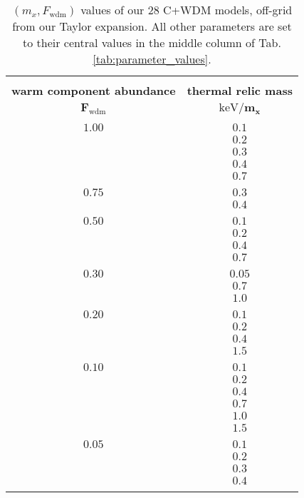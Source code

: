 \begin{table}
\begin{center}
\begin{tabular}{cc}
\hline \\[-10pt]
\textbf{warm component abundance} & \textbf{thermal relic mass} \\[2pt]
$\pmb{F_{\mathrm{wdm}}}$ & $\pmb{\mathrm{keV}/m_x}$ \\[2pt]
\hline \\[-10pt]
$1.00$ & $0.1$ \\[2pt]
 & $0.2$ \\[2pt]
 & $0.3$ \\[2pt]
 & $0.4$ \\[2pt]
 & $0.7$ \\[2pt]
\hline \\[-10pt]
$0.75$ & $0.3$ \\[2pt]
 & $0.4$ \\[2pt]
\hline \\[-10pt]
$0.50$ & $0.1$ \\[2pt]
 & $0.2$ \\[2pt]
 & $0.4$ \\[2pt]
 & $0.7$ \\[2pt]
\hline \\[-10pt]
$0.30$ & $0.05$ \\[2pt]
 & $0.7$ \\[2pt]
 & $1.0$ \\[2pt]
\hline \\[-10pt]
$0.20$ & $0.1$ \\[2pt]
 & $0.2$ \\[2pt]
 & $0.4$ \\[2pt]
 & $1.5$ \\[2pt]
\hline \\[-10pt]
$0.10$ & $0.1$ \\[2pt]
 & $0.2$ \\[2pt]
 & $0.4$ \\[2pt]
 & $0.7$ \\[2pt]
 & $1.0$ \\[2pt]
 & $1.5$ \\[2pt]
\hline \\[-10pt]
$0.05$ & $0.1$ \\[2pt]
 & $0.2$ \\[2pt]
 & $0.3$ \\[2pt] 
 & $0.4$ \\[2pt]
\hline \\[-10pt]
\end{tabular}
\end{center}
\caption{$\left( m_x, F_{\mathrm{wdm}} \right)$ values of our 28 C+WDM models, off-grid from our Taylor expansion. All other parameters are set to their central values in the middle column of Tab.\ref{tab:parameter_values}.}
\label{tab:cwdm_grid}
\end{table}




